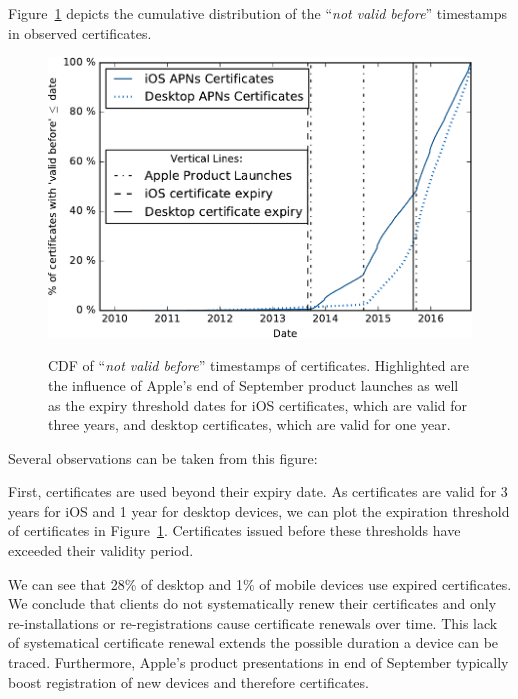 Figure~\ref{fig:certsvalid} depicts the cumulative distribution of the ``\emph{not valid before}'' timestamps in observed {\apns} certificates.
%
\begin{figure}%
	\href{https://github.com/tumi8/cca-privacy/blob/master/analyses/results/2_certificates_valid_from_anon.ipynb}{%
	\includegraphics[width=\columnwidth]{figures/certs_valid_from-crop.pdf}%
	}
	\caption{CDF of ``\emph{not valid before}'' timestamps of {\apns} certificates. Highlighted are the influence of Apple's end of September product launches as well as the expiry threshold dates for iOS certificates, which are valid for three years, and desktop certificates, which are valid for one year.}
	\label{fig:certsvalid}
\end{figure}%
Several observations can be taken from this figure:

First, certificates are used beyond their expiry date. As certificates are
valid for 3 years for iOS and 1 year for desktop devices, we can plot the expiration threshold
of certificates in Figure~\ref{fig:certsvalid}.
Certificates issued before these thresholds have exceeded their validity period.

We can see that 28\% of desktop and 1\% of mobile devices use expired certificates.
We conclude that {\apns} clients do not systematically renew their certificates and only
re-installations or re-registrations cause certificate renewals over time.
This lack of systematical certificate renewal extends the possible duration a device
can be traced.
Furthermore, Apple's product presentations in end of September typically boost registration of new devices and therefore certificates.
